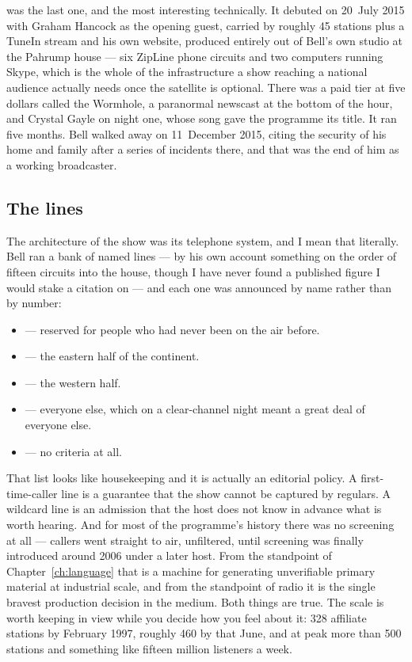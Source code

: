  was the last one, and the most interesting technically. It debuted on
20~July 2015 with Graham Hancock as the opening guest, carried by roughly 45 stations plus a TuneIn
stream and his own website, produced entirely out of Bell's own studio at the Pahrump house --- six
ZipLine phone circuits and two computers running Skype, which is the whole of the infrastructure a show
reaching a national audience actually needs once the satellite is optional. There was a paid tier at
five dollars called the Wormhole, a paranormal newscast at the bottom of the hour, and Crystal Gayle on
night one, whose song gave the programme its title. It ran five months. Bell walked away on
11~December 2015, citing the security of his home and family after a series of incidents there, and that
was the end of him as a working broadcaster.

\subsection{The lines}\label{sec:belllines}

The architecture of the show was its telephone system, and I mean that literally. Bell ran a bank of
named lines --- by his own account something on the order of fifteen circuits into the house, though I
have never found a published figure I would stake a citation on --- and each one was announced by name
rather than by number:

\begin{itemize}
  \item {} --- reserved for people who had never been on the air before.
  \item {} --- the eastern half of the continent.
  \item {} --- the western half.
  \item {} --- everyone else, which on a clear-channel night meant a great deal of
        everyone else.
  \item {} --- no criteria at all.
\end{itemize}

That list looks like housekeeping and it is actually an editorial policy. A first-time-caller line is a
guarantee that the show cannot be captured by regulars. A wildcard line is an admission that the host
does not know in advance what is worth hearing. And for most of the programme's history there was no
screening at all --- callers went straight to air, unfiltered, until screening was finally introduced
around 2006 under a later host. From the standpoint of Chapter~\ref{ch:language} that is a machine for
generating unverifiable primary material at industrial scale, and from the standpoint of radio it is the
single bravest production decision in the medium. Both things are true. The scale is worth keeping in
view while you decide how you feel about it: 328 affiliate stations by February 1997, roughly 460 by
that June, and at peak more than 500 stations and something like fifteen million listeners a week.

